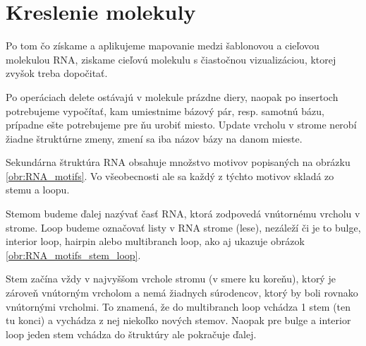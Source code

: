 \newcommand{\degree}{\ensuremath{^{\circ}}}

\chapter{Kreslenie molekuly}

Po tom čo získame a aplikujeme mapovanie medzi šablonovou a cieľovou molekulou RNA,
ziskame cieľovú molekulu s čiastočnou vizualizáciou, ktorej zvyšok treba dopočitať.

Po operáciach delete ostávajú v molekule prázdne diery, naopak po insertoch potrebujeme
vypočítať, kam umiestnime bázový pár, resp. samotnú bázu, prípadne ešte potrebujeme pre
ňu urobiť miesto. Update vrcholu v strome nerobí žiadne štruktúrne zmeny, zmení sa iba
názov bázy na danom mieste.

Sekundárna štruktúra RNA obsahuje množstvo motivov popisaných na obrázku \ref{obr:RNA_motifs}.
Vo všeobecnosti ale sa každý z týchto motivov skladá zo stemu a loopu.

Stemom budeme ďalej nazývať časť RNA, ktorá zodpovedá vnútornému vrcholu v strome. Loop
budeme označovať listy v RNA strome (lese), nezáleží či je to bulge, interior loop, hairpin
alebo multibranch loop, ako aj ukazuje obrázok \ref{obr:RNA_motifs_stem_loop}.

Stem začína vždy v najvyššom vrchole stromu (v smere ku koreňu), ktorý je zároveň vnútorným
vrcholom a nemá žiadnych súrodencov, ktorý by boli rovnako vnútornými vrcholmi.
To znamená, že do multibranch loop vchádza 1 stem (ten tu konci) a vychádza z nej niekoľko nových stemov.
Naopak pre bulge a interior loop jeden stem vchádza do štruktúry ale pokračuje ďalej.

